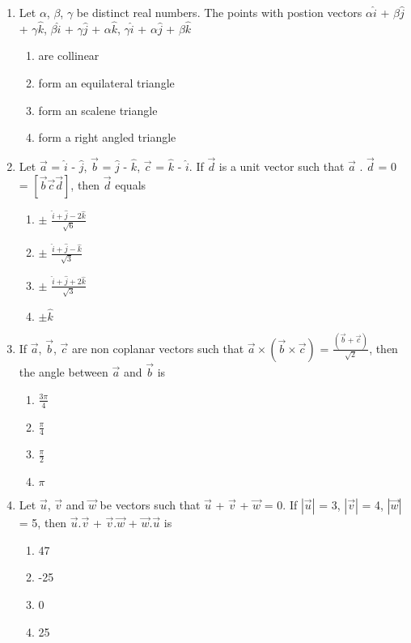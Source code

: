 \begin{enumerate}[label=\arabic*.,ref=\thesubsection.\theenumi]
\item Let $\alpha$, $\beta$, $\gamma$ be distinct real numbers. The points with postion vectors 
$\alpha \hat{i}$ + $\beta \hat{j}$ + $\gamma \hat{k}$, $\beta \hat{i}$ + $\gamma \hat{j}$ + $\alpha \hat{k}$, $\gamma \hat{i}$ + $\alpha \hat{j}$ + $\beta \hat{k}$
\begin{enumerate}
\item are collinear
\item form an equilateral triangle
\item form an scalene triangle
\item form a right angled triangle
\end{enumerate}

\item Let $\overrightarrow{a}$ = $\hat{i}$ - $\hat{j}$, $\overrightarrow{b}$ = $\hat{j}$ - $\hat{k}$, 
$\overrightarrow{c}$ = $\hat{k}$ - $\hat{i}$. If $\overrightarrow{d}$ is a unit vector such that 
$\overrightarrow{a}$ . $\overrightarrow{d}$ = 0 = $[\overrightarrow{b} \overrightarrow{c} \overrightarrow{d}]$, then $\overrightarrow{d}$ equals
\begin{enumerate}
\item $\pm$ $\frac{\hat{i} + \hat{j} - 2\hat{k}}{\sqrt{6}}$
\item $\pm$ $\frac{\hat{i} + \hat{j} - \hat{k}}{\sqrt{3}}$
\item $\pm$ $\frac{\hat{i} + \hat{j} + 2\hat{k}}{\sqrt{3}}$
\item $\pm \hat{k}$
\end{enumerate}

\item If $\overrightarrow{a}$, $\overrightarrow{b}$, $\overrightarrow{c}$ are non coplanar vectors such that $\overrightarrow{a} \times (\overrightarrow{b} \times \overrightarrow{c})$ = $\frac{(\overrightarrow{b} + \overrightarrow{c})}{\sqrt{2}}$, then the angle between $\overrightarrow{a}$ and $\overrightarrow{b}$ is
\begin{enumerate}
\item $\frac{3\pi}{4}$
\item $\frac{\pi}{4}$
\item $\frac{\pi}{2}$
\item $\pi$
\end{enumerate}

\item Let $\overrightarrow{u}$, $\overrightarrow{v}$ and $\overrightarrow{w}$ be vectors such that $\overrightarrow{u}$ + $\overrightarrow{v}$ + $\overrightarrow{w}$ = 0. If $|\overrightarrow{u}|$ = 3, $|\overrightarrow{v}|$ = 4, $|\overrightarrow{w}|$ = 5, then $\overrightarrow{u}.\overrightarrow{v}$  + $\overrightarrow{v}.\overrightarrow{w}$ + $\overrightarrow{w}.\overrightarrow{u}$ is
\begin{enumerate}
\item 47
\item -25
\item 0
\item 25
\end{enumerate}


\end{enumerate}
